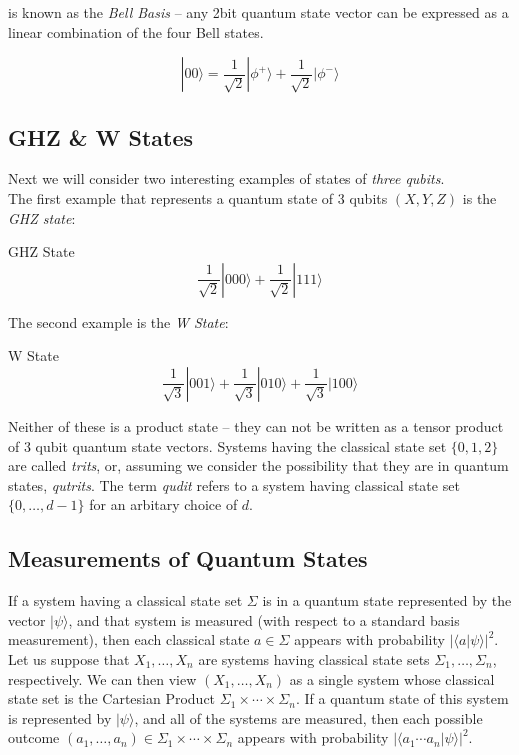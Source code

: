 \documentclass[svgnames]{article}     %
\begin{document}
is known as the \textit{Bell Basis} -- any 2bit quantum state vector can be expressed as a linear combination of the four Bell states. 

\[
  |00\rangle = \frac{1}{\sqrt{2}}|\phi^+\rangle + \frac{1}{\sqrt{2}}|\phi^-\rangle 
\] \vspace{5px}


\subsection{GHZ \& W States}

Next we will consider two interesting examples of states of \textit{three qubits}. \\

The first example that represents a quantum state of 3 qubits $(X, Y, Z)$ is the \textit{GHZ state}: 
\begin{subbox}{GHZ State}
\[
  \frac{1}{\sqrt{2}} |000\rangle + \frac{1}{\sqrt{2}}|111\rangle 
\] 
\end{subbox}
The second example is the \textit{W State}: 
\begin{mainbox}{W State} 
\[
  \frac{1}{\sqrt{3}}|001\rangle + \frac{1}{\sqrt{3}}|010\rangle + \frac{1}{\sqrt{3}}|100\rangle 
\] 
\end{mainbox}

Neither of these is a product state -- they can not be written as a tensor
product of 3 qubit quantum state vectors. Systems having the classical state set $\{0, 1, 2\}$ are called \textit{trits}, or, assuming we consider the possibility that they are in quantum states, \textit{qutrits}. The term \textit{qudit} refers to a system having classical state set $\{0, \hdots, d-1\}$ for an arbitary choice of $d$.  

\subsection{Measurements of Quantum States}

If a system having a classical state set $\Sigma$ is in a quantum state represented by the vector  $|\psi\rangle $, and that system is measured (with respect to a standard basis measurement), then each classical state $a \in \Sigma$ appears with probability $|\langle a | \psi \rangle |^2 .$ \\

Let us suppose that  $X_1, \hdots, X_n$ are systems having classical state sets $\Sigma_1, \hdots, \Sigma_n$, respectively. We can then view $(X_1, \hdots, X_n)$ as a single system whose classical state set is the Cartesian Product $\Sigma_1 \times \cdots \times \Sigma_n$. If a quantum state of this system is represented by $|\psi\rangle $, and all of the systems are measured, then each possible outcome $(a_1, \hdots, a_n) \in \Sigma_1 \times \cdots \times \Sigma_n$  appears with probability $|\langle a_1\cdots a_n | \psi \rangle |^2$.\\
\end{document}
